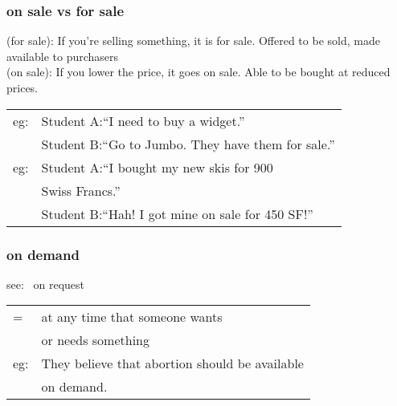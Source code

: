 \documentclass[14pt, t]{beamer}
\begin{document}
\begin{frame}
\frametitle{on sale vs for sale}
(for sale): If you're selling something, it is for sale. 
	Offered to be sold, made available to purchasers \\[8pt]
(on sale): If you lower the price, it goes on sale. 
	Able to be bought at reduced prices. \\[8pt]
\begin{tabular}{ll}
eg: & Student A:``I need to buy a widget.'' \\[1pt]
	& Student B:``Go to Jumbo. They have them for sale.'' \\[8pt]
eg: &  Student A:``I bought my new skis for 900 \\[1pt]
	& Swiss Francs.''\\[2pt]
	& Student B:``Hah! I got mine on sale for 450 SF!'' \\
\end{tabular} 
\end{frame}
\begin{frame}
\frametitle{on demand}
see: \, on request \\[8pt]
\begin{tabular}{ll}
= & at any time that someone wants\\[1pt]
	& or needs something \\[8pt]
%
eg: & They believe that abortion should be available\\[1pt]
	& on demand. \\
\end{tabular} \\
\end{frame}
\end{document}
